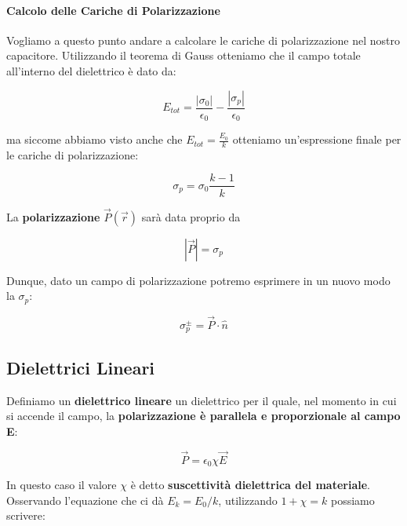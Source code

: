 \paragraph{Calcolo delle Cariche di Polarizzazione}
Vogliamo a questo punto andare a calcolare le cariche di polarizzazione nel nostro capacitore. Utilizzando il teorema di Gauss otteniamo che il campo totale all'interno del dielettrico è dato da: 

$$ 
E_{tot}= \frac{\left|\sigma_0\right|}{\epsilon_0} - \frac{\left|\sigma_p\right|}{\epsilon_0} 
$$

ma siccome abbiamo visto anche che $E_{tot} = \frac{E_0}{k}$ otteniamo un'espressione finale per le cariche di polarizzazione: 

\begin{large}
	\begin{equation} \label{eq_cariche_polarizzazione}
		\sigma_p = \sigma_0 \frac{k-1}{k}
	\end{equation}
\end{large}

La \textbf{polarizzazione} $\vec{P}(\vec{r})$ sarà data proprio da
\begin{large}
	\begin{equation}
		\left|\vec{P}\right| = \sigma_p
	\end{equation}
\end{large}

Dunque, dato un campo di polarizzazione potremo esprimere in un nuovo modo la $\sigma_p$: 
\begin{large}
	\begin{equation}
		\sigma_p^\pm = \vec{P} \cdot \hat{n}
	\end{equation}
\end{large}

\subsection{Dielettrici Lineari}
Definiamo un \textbf{dielettrico lineare} un dielettrico per il quale, nel momento in cui si accende il campo, la \textbf{polarizzazione è parallela e proporzionale al campo E}: 

\begin{large}
	\begin{equation} \label{eq_polarizzazione_lineare}
		\vec{P} = \epsilon_0 \chi \vec{E}
	\end{equation}
\end{large}

In questo caso il valore $\chi$ è detto \textbf{suscettività dielettrica del materiale}. Osservando l'equazione che ci dà $E_k = E_0 / k$, utilizzando $1 + \chi = k$ possiamo scrivere: 

